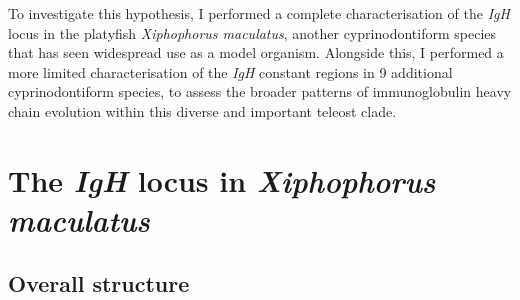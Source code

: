 	To investigate this hypothesis, I performed a complete characterisation of the \textit{IgH} locus in the platyfish \textit{Xiphophorus maculatus}, another cyprinodontiform species that has seen widespread use as a model organism. Alongside this, I performed a more limited characterisation of the \textit{IgH} constant regions in 9 %
	additional cyprinodontiform species, to assess the broader patterns of immunoglobulin heavy chain evolution within this diverse and important teleost clade.
	
%
%



\section{The \textit{IgH} locus in \textit{Xiphophorus maculatus}}

	\subsection{Overall structure}
	
